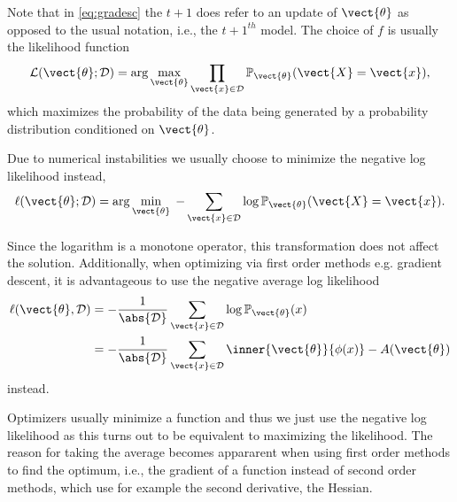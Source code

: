     Note that in \eq\ref{eq:gradesc} the $t+1$ does refer to an update of $\vect{\theta}$ as opposed to the usual notation, i.e., the $t+1^{th}$ model. 
    The choice of $f$ is usually the likelihood function
    \begin{equation}
        \label{eq:likelihood}
        \mathcal{L}(\vect{\theta} ; \mathcal{D}) = \arg\max_{\vect{\theta}}\prod_{\vect{x} \in \mathcal{D}}  \mathbb{P}_{\vect{\theta}}(\vect{X} = \vect{x}),
    \end{equation}
    which maximizes the probability of the data being generated by a probability distribution conditioned on $\vect{\theta}$.

    Due to numerical instabilities we usually choose to minimize the negative log likelihood instead,
    \begin{equation}
        \label{eq:likelihood:log}
        \ell(\vect{\theta} ; \mathcal{D}) = \arg\min_{\vect{\theta}} \; - \sum_{\vect{x} \in \mathcal{D}}  \log \mathbb{P}_{\vect{\theta}}(\vect{X} = \vect{x}).
    \end{equation}

    Since the logarithm is a monotone operator, this transformation does not affect the solution.
    Additionally, when optimizing via first order methods e.g. gradient descent, it is advantageous to use the negative average log likelihood
    \begin{equation}
        \label{eq:likelihood:expfam}
        \begin{split}
        \ell(\vect{\theta}, \mathcal{D}) &= - \frac{1}{\abs{\mathcal{D}}} \sum_{\vect{x} \in \mathcal{D}} \log \mathbb{P}_{\vect{\theta}}(x)\\
        &= - \frac{1}{\abs{\mathcal{D}}} \sum_{\vect{x} \in \mathcal{D}} \inner{\vect{\theta}}{\phi(x)} - A(\vect{\theta})
    \end{split}
    \end{equation}
    instead.

    Optimizers usually minimize a function and thus we just use the negative log likelihood as this turns out to be equivalent to maximizing the likelihood.
    The reason for taking the average becomes appararent when using first order methods to find the optimum, i.e., the gradient of a function instead of second order methods, which use for example the second derivative, the Hessian.

